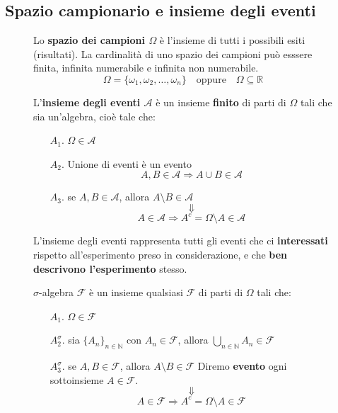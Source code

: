 \documentclass[a4paper]{article}
\theoremstyle{break}
\theoremstyle{break}
\theoremstyle{break}
\theoremstyle{break}
\begin{document}
\subsection{Spazio campionario e insieme degli eventi}
\begin{figure}[H]
	\begin{definition}
		Lo \textbf{spazio dei campioni \( \Omega \) } è l'insieme di tutti i possibili esiti
		(risultati). La cardinalità di uno spazio dei campioni può esssere finita, infinita
		numerabile e infinita non numerabile.
		\[
			\Omega = \{\omega_1, \omega_2, \ldots, \omega_n\} \quad \text{oppure} \quad
			\Omega \subseteq \mathbb{R}
		\]
	\end{definition}
\end{figure}
\begin{figure}[H]
	\begin{definition}
		L'\textbf{insieme degli eventi \( \mathcal{A} \) } è un insieme \textbf{finito} di
		parti di \( \Omega \) tali che sia un'algebra, cioè tale che:
		\begin{enumerate}
			\item[$A_1$.] \( \Omega \in \mathcal{A} \)
			\item[$A_2$.] Unione di eventi è un evento
			      \[
				      A,B \in \mathcal{A} \Rightarrow A \cup B \in \mathcal{A}
			      \]
			\item[$A_3$.] se \( A,B \in \mathcal{A} \), allora \( A \setminus B \in \mathcal{A}  \)
			      \[
				      \Downarrow
			      \]
			      \[
				      A \in \mathcal{A} \Rightarrow A^c = \Omega \setminus A \in \mathcal{A}
			      \]
		\end{enumerate}
		L'insieme degli eventi rappresenta tutti gli eventi che ci \textbf{interessati}
		rispetto all'esperimento preso in considerazione, e che \textbf{ben descrivono
			l'esperimento} stesso.
	\end{definition}
\end{figure}

\begin{figure}[H]
	\begin{definition}
		\( \sigma  \)-algebra \( \mathcal{F} \) è un insieme qualsiasi \( \mathcal{F} \) di
		parti di \( \Omega \) tali che:
		\begin{enumerate}
			\item[$A_1$.] \( \Omega \in \mathcal{F} \)
			\item[$A_2^\sigma$.] sia \( \{A_n\}_{n \in \mathbb{N}}\) con \(A_n \in \mathcal{F}\),
			      allora \(\bigcup_{n \in \mathbb{N}} A_n \in \mathcal{F}\)
			\item[$A_3^\sigma$.] se \( A,B \in \mathcal{F} \), allora \( A \setminus B \in \mathcal{F}\)
			      Diremo \textbf{evento} ogni sottoinsieme \( A \in \mathcal{F} \).
			      \[
				      \Downarrow
			      \]
			      \[
				      A \in \mathcal{F} \Rightarrow A^c = \Omega \setminus A \in \mathcal{F}
			      \]
		\end{enumerate}
	\end{definition}
\end{figure}
\end{document}
